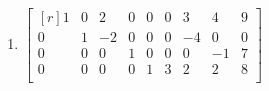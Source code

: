 \documentclass[12pt]{article}
\begin{document}
\begin{enumerate}
Finally, in terms of set notation:
\[
\left\{
\begin{bmatrix*}[r]            2 \\ 0\\ 0\\ -8\\ 0\\ 10\\ 0\end{bmatrix*}
+\lambda_1\begin{bmatrix*}[r] -2 \\ 1\\ 0\\  0\\ 0\\  0\\ 0\end{bmatrix*}
+\lambda_2\begin{bmatrix*}[r] -3 \\ 0\\ 1\\  0\\ 0\\  0\\ 0\end{bmatrix*}
+\lambda_3\begin{bmatrix*}[r] -2 \\ 0\\ 0\\  2\\ 1\\  0\\ 0\end{bmatrix*}
+\lambda_4\begin{bmatrix*}[r] -5 \\ 0\\ 0\\ -3\\ 0\\ -4\\ 1\end{bmatrix*}
\;:\;\lambda_1,\lambda_2,\lambda_3,\lambda_4\in\R\right\}
\]
\proofend

\bigskip
\item
$\begin{bmatrix*}[r]
1 & 0 &  2 & 0 & 0 & 0 &  3 &  4 & 9\\
0 & 1 & -2 & 0 & 0 & 0 & -4 &  0 & 0\\
0 & 0 &  0 & 1 & 0 & 0 &  0 & -1 & 7\\
0 & 0 &  0 & 0 & 1 & 3 &  2 &  2 & 8\\
\end{bmatrix*}$


\end{enumerate}
\end{document}
